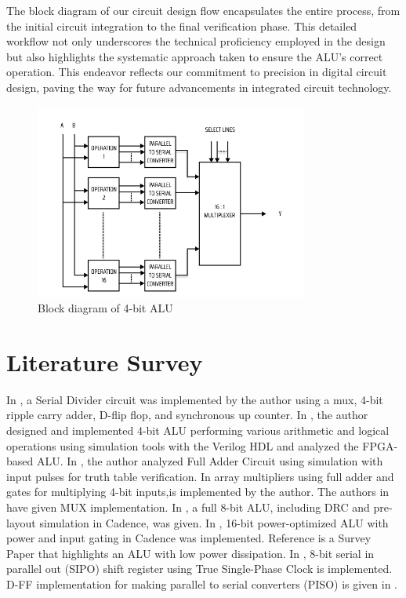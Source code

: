 \documentclass[conference]{IEEEtran}
\begin{document}
The block diagram of our circuit design flow encapsulates the entire process, from the initial circuit integration to the final verification phase. This detailed workflow not only underscores the technical proficiency employed in the design but also highlights the systematic approach taken to ensure the ALU's correct operation. 
This endeavor reflects our commitment to precision in digital circuit design, paving the way for future advancements in integrated circuit technology.
\begin{figure}[htbp]
\centerline{\includegraphics[width=9cm,keepaspectratio,]{"ALU_Block_diagram.png"}}
\caption{Block diagram of 4-bit ALU}
\label{fig1}
\end{figure}


\section{Literature Survey}\label{B}
In \cite{b1}, a Serial Divider circuit was implemented by the author using a mux, 4-bit ripple carry adder, D-flip flop, and synchronous up counter. In \cite{b2}, the author designed and implemented 4-bit ALU performing various arithmetic and logical operations using simulation tools with the Verilog HDL and analyzed the FPGA-based ALU. In \cite{b3}, the author analyzed Full Adder Circuit using simulation with input pulses for truth table verification. In \cite{b4} array multipliers using full adder and gates for multiplying 4-bit inputs,is implemented by the author. The authors in \cite{b5} have given MUX implementation. In \cite{b6}, a full 8-bit ALU, including DRC and pre-layout simulation in Cadence, was given. In \cite{b7}, 16-bit power-optimized ALU with power and input gating in Cadence was implemented. Reference \cite{b8} is a Survey Paper that highlights an ALU with low power dissipation. In \cite{b9}, 8-bit serial in parallel out (SIPO) shift register using True Single-Phase Clock is implemented. D-FF implementation for making parallel to serial converters (PISO) is given in \cite{b10}.
\\
\end{document}
